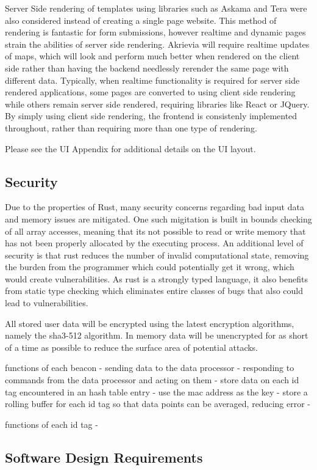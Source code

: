 \bigskip
Server Side rendering of templates using libraries such as Askama and Tera were also considered instead of creating a single page website.
This method of rendering is fantastic for form submissions, however realtime and dynamic pages strain the abilities of server side rendering.
Akrievia will require realtime updates of maps, which will look and perform much better when rendered on the client side rather than having the backend needlessly rerender the same page with different data.
Typically, when realtime functionality is required for server side rendered applications, some pages are converted to using client side rendering while others remain server side rendered, requiring libraries like React or JQuery.
By simply using client side rendering, the frontend is consistenly implemented throughout, rather than requiring more than one type of rendering.

\bigskip
Please see the UI Appendix for additional details on the UI layout.

\subsection{Security}
Due to the properties of Rust, many security concerns regarding bad input data and memory issues are mitigated.
One such migitation is built in bounds checking of all array accesses, meaning that its not possible to read or write memory that has not been properly allocated by the executing process.
An additional level of security is that rust reduces the number of invalid computational state, removing the burden from the programmer which could potentially get it wrong, which would create vulnerabilities.
As rust is a strongly typed language, it also benefits from static type checking which eliminates entire classes of bugs that also could lead to vulnerabilities.

\bigskip
All stored user data will be encrypted using the latest encryption algorithms, namely the sha3-512 algorithm.
In memory data will be unencrypted for as short of a time as possible to reduce the surface area of potential attacks.

\bigskip

functions of each beacon
	- sending data to the data processor
	- responding to commands from the data processor and acting on them
	- store data on each id tag encountered in an hash table entry - use the mac address as the key
	- store a rolling buffer for each id tag so that data points can be averaged, reducing error
	-

\bigskip

functions of each id tag
	-




\pagebreak
\subsection{Software Design Requirements}
